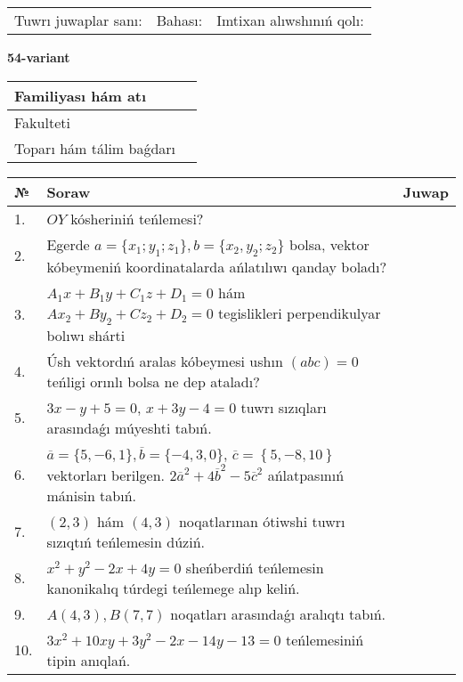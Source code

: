 \documentclass{article}
\begin{document}
\vspace{1cm}

\begin{tabular}{lll}
Tuwrı juwaplar sanı: \underline{\hspace{1.5cm}} & 
Bahası: \underline{\hspace{1.5cm}} & 
Imtixan alıwshınıń qolı: \underline{\hspace{2cm}} \\
\end{tabular}

\egroup

\newpage


\textbf{54-variant}\\

\bgroup
\def\arraystretch{1.6} %

\begin{tabular}{|m{5.7cm}|m{9.5cm}|}
\hline
Familiyası hám atı & \\
\hline
Fakulteti  & \\
\hline
Toparı hám tálim baǵdarı  & \\
\hline
\end{tabular}

\vspace{1cm}

\begin{tabular}{|m{0.7cm}|m{10cm}|m{4cm}|}
\hline
№ & Soraw & Juwap \\
\hline
1. & $OY$ kósheriniń teńlemesi? &  \\
\hline
2. & Egerde $a=\{ x_1; y_1; z_1\}, b=\{ x_2, y_2; z_2\}$ bolsa, vektor kóbeymeniń koordinatalarda ańlatılıwı qanday boladı? &  \\
\hline
3. & $A_1x+B_1y+C_1z+D_1=0$ hám $Ax_2+By_2+Cz_2+D_2=0$ tegislikleri perpendikulyar bolıwı shárti &  \\
\hline
4. & Úsh vektordıń aralas kóbeymesi ushın $(abc)=0$ teńligi orınlı bolsa ne dep ataladı? &  \\
\hline
5. & $3x-y+5=0$, $x+3y-4=0$ tuwrı sızıqları arasındaǵı múyeshti tabıń. &  \\
\hline
6. & $\overline{a}=\{5,-6, 1 \}, \overline{b}=\{-4, 3, 0 \} $, $\overline{c}=\left\{ 5,-8, 10 \right\}$ vektorları berilgen. $2{\overline{a}}^{2}+4{\overline{b}}^{2}-5{\overline{c}}^{2}$ ańlatpasınıń mánisin tabıń. &  \\
\hline
7. & $(2, 3)$ hám $(4, 3)$ noqatlarınan ótiwshi tuwrı sızıqtıń teńlemesin dúziń. &  \\
\hline
8. & $x^{2}+y^{2}-2x+4y=0$ sheńberdiń teńlemesin kanonikalıq túrdegi teńlemege alıp keliń. &  \\
\hline
9. & $A(4, 3), B(7, 7)$ noqatları arasındaǵı aralıqtı tabıń. &  \\
\hline
10. & $3x^{2}+10xy+3y^{2}-2x-14y-13=0$ teńlemesiniń tipin anıqlań. &  \\
\hline
\end{tabular}
\end{document}

